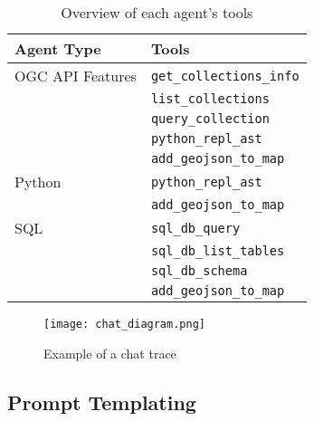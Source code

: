 \begin{table}
    \centering
    \caption{Overview of each agent's tools}
    \label{tbl:agent-tool-overview}
    \begin{tabularx}{0.7\textwidth}{XX}
        \toprule
        \textbf{Agent Type} & \textbf{Tools}                  \\
        \midrule
        OGC API Features    & \texttt{get\_collections\_info} \\
                            & \texttt{list\_collections}      \\
                            & \texttt{query\_collection}      \\
                            & \texttt{python\_repl\_ast}      \\
                            & \texttt{add\_geojson\_to\_map}  \\
        \midrule
        Python              & \texttt{python\_repl\_ast}      \\
                            & \texttt{add\_geojson\_to\_map}  \\
        \midrule
        SQL                 & \texttt{sql\_db\_query}         \\
                            & \texttt{sql\_db\_list\_tables}  \\
                            & \texttt{sql\_db\_schema}        \\
                            & \texttt{add\_geojson\_to\_map}  \\
        \bottomrule
    \end{tabularx}
\end{table}

\begin{figure}
    \centering
    \texttt{[image: chat\_diagram.png]}
    \caption{Example of a chat trace}
    \label{fig:chat-trace-example}
\end{figure}


\subsection{Prompt Templating}
\label{subsec:prompt-templating}

